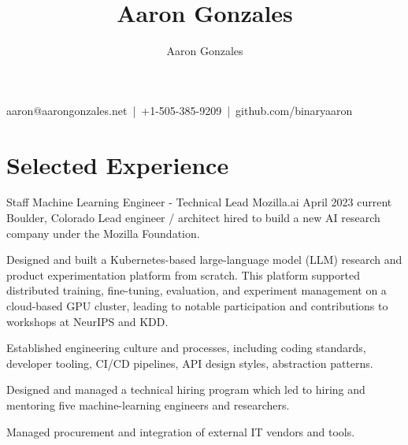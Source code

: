 \documentclass[print]{ag-cv} %
\title{Aaron Gonzales}
\author{Aaron Gonzales}
\makeatletter
\renewcommand\maketitle{
{\raggedright %
{aaron@aarongonzales.net~|~+1-505-385-9209~|~github.com/binaryaaron}\\
\vspace{3mm}
{\headingfont \bfseries \@title }
}
} %
\makeatother
\begin{document}
\pagestyle{fancy} %
\fancyhf{}
\fancyhead{}
\fancyfoot{}
\cfoot{}
\renewcommand{\headrulewidth}{0pt}
\renewcommand{\footrulewidth}{0pt}
\maketitle

\raggedright
\section*{Selected Experience}

\begin{job}
  {Staff Machine Learning Engineer - Technical Lead} 
  {Mozilla.ai}
  {April 2023}
  {current}
  {Boulder, Colorado}
  {
  Lead engineer / architect hired to build a new AI research company under the Mozilla Foundation.
  }
{
  \begin{myitemize}
    \item Designed and built a Kubernetes-based large-language model
    (LLM) research and product experimentation platform from scratch. This
    platform supported distributed training, fine-tuning, evaluation, and
    experiment management on a cloud-based GPU cluster, leading to notable
    participation and contributions to workshops at NeurIPS and KDD\autocite{kdd_2023_workshop,neurips_llm_efficiency_2023}. 
    \item Established engineering culture and processes, including coding
    standards, developer tooling, CI/CD pipelines, API design styles,
    abstraction patterns.
    \item Designed and managed a technical hiring program which led to hiring and mentoring five machine-learning engineers and researchers. 
    \item Managed procurement and integration of external IT vendors and tools.
  \end{myitemize}
}
\end{job}
\end{document}
